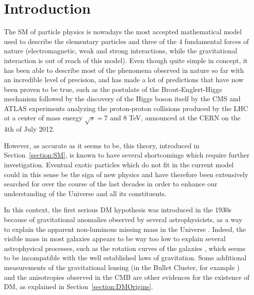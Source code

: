 \documentclass[a4paper, 10pt, openright]{report}
\renewcommand{\headrulewidth}{0pt}%
\renewcommand{\footrulewidth}{0pt}%
\begin{document}
\fancypagestyle{plain}{%
  \fancyhf{}
  \fancyfoot{}
  \renewcommand{\headrulewidth}{0pt}%
  \renewcommand{\footrulewidth}{0pt}%
}
\setlength{\headheight}{36pt} %
\chapter{Introduction}

The \acf{SM} of particle physics \cite{SM} is nowadays the most accepted mathematical model used to describe the elementary particles and three of the 4 fundamental forces of nature (electromagnetic, weak and strong interactions, while the gravitational interaction is out of reach of this model). Even though quite simple in concept, it has been able to describe most of the phenomena observed in nature so far with an incredible level of precision, and has made a lot of predictions that have now been proven to be true, such as the postulate of the Brout-Englert-Higgs mechanism \cite{HiggsPostulate1, HiggsPostulate2} followed by the discovery of the Higgs boson itself \cite{HiggsDiscovery1, HiggsDiscovery2} by the \ac{CMS} \cite{CMS} and \ac{ATLAS} \cite{ATLAS} experiments analyzing the proton-proton collisions produced by the \acf{LHC} at a center of mass energy $\sqrt{s} = 7$ and 8 TeV, announced at the \ac{CERN} on the 4th of July 2012. 

However, as accurate as it seems to be, this theory, introduced in Section~\ref{section:SM}, is known to have several shortcomings which require further investigation. Eventual exotic particles which do not fit in the current model could in this sense be the sign of new physics and have therefore been extensively searched for over the course of the last decades in order to enhance our understanding of the Universe and all its constituents.

In this context, the first serious \acf{DM} hypothesis was introduced in the 1930s because of gravitational anomalies observed by several astrophysicists, as a way to explain the apparent non-luminous missing mass in the Universe \cite{FirstEvidence}. Indeed, the visible mass in most galaxies appears to be way too low to explain several astrophysical processes, such as the rotation curves of the galaxies \cite{RotationCurves}, which seems to be incompatible with the well established laws of gravitation. Some additional measurements of the gravitational lensing (in the Bullet Cluster, for example \cite{BulletCluster}) and the anisotropies observed in the \acf{CMB} \cite{CMBAnisotropies} are other evidences for the existence of \ac{DM}, as explained in Section~\ref{section:DMOrigins}.
\end{document}
